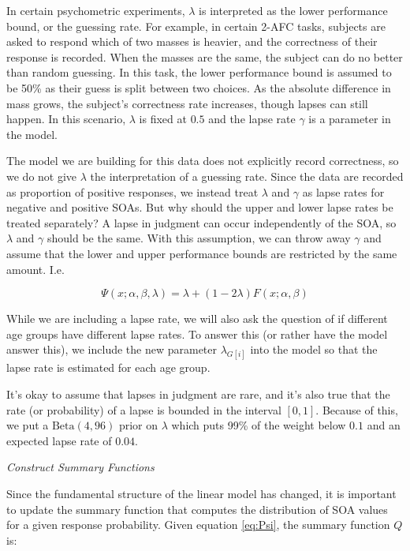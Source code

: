 \documentclass[11pt, oneside, openany]{scrbook}
\begin{document}
In certain psychometric experiments, \(\lambda\) is interpreted as the lower performance bound, or the guessing rate. For example, in certain 2-AFC tasks, subjects are asked to respond which of two masses is heavier, and the correctness of their response is recorded. When the masses are the same, the subject can do no better than random guessing. In this task, the lower performance bound is assumed to be 50\% as their guess is split between two choices. As the absolute difference in mass grows, the subject's correctness rate increases, though lapses can still happen. In this scenario, \(\lambda\) is fixed at \(0.5\) and the lapse rate \(\gamma\) is a parameter in the model.

The model we are building for this data does not explicitly record correctness, so we do not give \(\lambda\) the interpretation of a guessing rate. Since the data are recorded as proportion of positive responses, we instead treat \(\lambda\) and \(\gamma\) as lapse rates for negative and positive SOAs. But why should the upper and lower lapse rates be treated separately? A lapse in judgment can occur independently of the SOA, so \(\lambda\) and \(\gamma\) should be the same. With this assumption, we can throw away \(\gamma\) and assume that the lower and upper performance bounds are restricted by the same amount. I.e.

\begin{equation}
  \Psi(x; \alpha, \beta, \lambda) = \lambda + (1 - 2\lambda) F(x; \alpha, \beta)
  \label{eq:Psi}
\end{equation}

While we are including a lapse rate, we will also ask the question of if different age groups have different lapse rates. To answer this (or rather have the model answer this), we include the new parameter \(\lambda_{G[i]}\) into the model so that the lapse rate is estimated for each age group.

It's okay to assume that lapses in judgment are rare, and it's also true that the rate (or probability) of a lapse is bounded in the interval \([0, 1]\). Because of this, we put a \(\mathrm{Beta(4, 96)}\) prior on \(\lambda\) which puts 99\% of the weight below \(0.1\) and an expected lapse rate of \(0.04\).

\emph{Construct Summary Functions}

Since the fundamental structure of the linear model has changed, it is important to update the summary function that computes the distribution of SOA values for a given response probability. Given equation \eqref{eq:Psi}, the summary function \(Q\) is:
\end{document}
